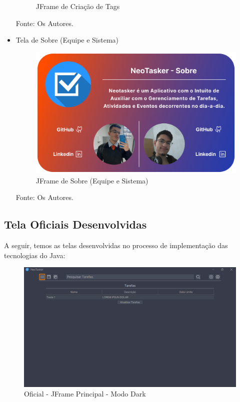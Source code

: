 \documentclass[a4paper,12pt]{article}
\begin{document}
\begin{itemize}
\begin{figure}[H]
		\caption{JFrame de Criação de Tags}
	\end{figure}
	\noindent Fonte: Os Autores.
	\item Tela de Sobre (Equipe e Sistema)
	\begin{figure}[H]
		\centering
		\includegraphics[scale=0.19]{prototypes/white/About Us Panel Window.png}
		\caption{JFrame de Sobre (Equipe e Sistema)}
	\end{figure}
	\noindent Fonte: Os Autores.
\end{itemize}

\subsection{Tela Oficiais Desenvolvidas}
A seguir, temos as telas desenvolvidas no processo de implementação das tecnologias do Java:

\begin{figure}[H]
	\centering
	\includegraphics[scale=0.19]{prototypes/oficial_dark/list.png}
	\caption{Oficial - JFrame Principal - Modo Dark}
\end{figure}
\end{document}
